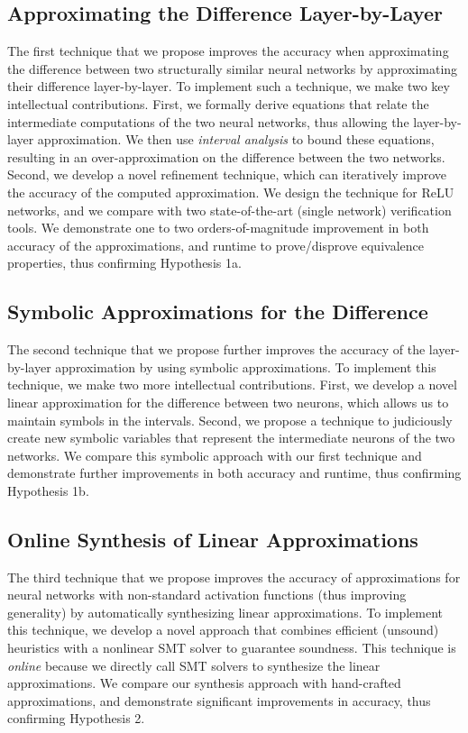 \subsection{Approximating the Difference Layer-by-Layer}
The first technique that we propose improves the accuracy when approximating the
difference between two structurally similar neural networks by approximating
their difference layer-by-layer. To implement such a technique, we make two key
intellectual contributions. First, we formally derive equations that relate the
intermediate computations of the two neural networks, thus allowing the
layer-by-layer approximation. We then use \textit{interval analysis} to bound these
equations, resulting in an over-approximation on the difference between the two
networks. Second, we develop a novel refinement technique, which can
iteratively improve the accuracy of the computed approximation. We
design the technique for ReLU networks, and we compare with two state-of-the-art
(single network) verification tools. We demonstrate one to two
orders-of-magnitude improvement in both accuracy of the approximations, and
runtime to prove/disprove equivalence properties, thus confirming Hypothesis 1a.

\subsection{Symbolic Approximations for the Difference}
The second technique that we propose further improves the accuracy of the
layer-by-layer approximation by using symbolic approximations. To implement this
technique, we make two more intellectual contributions. First, we develop a novel
linear approximation for the difference between two neurons, which allows us to
maintain symbols in the intervals. Second, we propose a technique to
judiciously create new symbolic variables that represent the intermediate neurons
of the two networks. We compare this symbolic approach with our first technique
and demonstrate further improvements in both accuracy and runtime, thus
confirming Hypothesis 1b.

\subsection{Online Synthesis of Linear Approximations}
The third technique that we propose improves the accuracy of approximations for
neural networks with non-standard activation functions (thus improving
generality) by automatically synthesizing linear approximations. To implement
this technique, we develop a novel approach that combines efficient (unsound) heuristics
with a nonlinear SMT solver to guarantee soundness. This technique is \textit{online}
because we directly call SMT solvers to synthesize the linear approximations. We compare
our synthesis approach with hand-crafted approximations, and demonstrate significant
improvements in accuracy, thus confirming Hypothesis 2.

